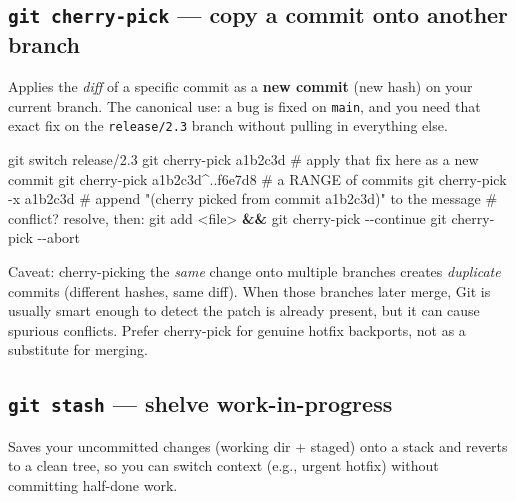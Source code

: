 \documentclass[11pt]{article}
\newenvironment{Shaded}{\begin{snugshade}}{\end{snugshade}}
\newcommand{\AttributeTok}[1]{\textcolor[rgb]{0.16,0.50,0.73}{#1}}
\newcommand{\CommentTok}[1]{\textcolor[rgb]{0.48,0.49,0.49}{#1}}
\newcommand{\FunctionTok}[1]{\textcolor[rgb]{0.56,0.27,0.68}{#1}}
\newcommand{\KeywordTok}[1]{\textcolor[rgb]{0.81,0.81,0.76}{\textbf{#1}}}
\newcommand{\NormalTok}[1]{\textcolor[rgb]{0.81,0.81,0.76}{#1}}
\newcommand{\OperatorTok}[1]{\textcolor[rgb]{0.81,0.81,0.76}{#1}}
\begin{document}
\subsection{\texorpdfstring{\texttt{git\ cherry-pick} --- copy a commit onto another branch}{git cherry-pick --- copy a commit onto another branch}}\label{git-cherry-pick--copy-a-commit-onto-another-branch}

Applies the \emph{diff} of a specific commit as a \textbf{new commit} (new hash) on your current branch. The canonical use: a bug is fixed on \texttt{main}, and you need that exact fix on the \texttt{release/2.3} branch without pulling in everything else.


\begin{Shaded}
\begin{Highlighting}[]
\FunctionTok{git}\NormalTok{ switch release/2.3}
\FunctionTok{git}\NormalTok{ cherry{-}pick a1b2c3d              }\CommentTok{\# apply that fix here as a new commit}
\FunctionTok{git}\NormalTok{ cherry{-}pick a1b2c3d\^{}..f6e7d8     }\CommentTok{\# a RANGE of commits}
\FunctionTok{git}\NormalTok{ cherry{-}pick }\AttributeTok{{-}x}\NormalTok{ a1b2c3d           }\CommentTok{\# append "(cherry picked from commit a1b2c3d)" to the message}
\CommentTok{\# conflict? resolve, then:}
\FunctionTok{git}\NormalTok{ add }\OperatorTok{\textless{}}\NormalTok{file}\OperatorTok{\textgreater{}} \KeywordTok{\&\&} \FunctionTok{git}\NormalTok{ cherry{-}pick }\AttributeTok{{-}{-}continue}
\FunctionTok{git}\NormalTok{ cherry{-}pick }\AttributeTok{{-}{-}abort}
\end{Highlighting}
\end{Shaded}

Caveat: cherry-picking the \emph{same} change onto multiple branches creates \emph{duplicate} commits (different hashes, same diff). When those branches later merge, Git is usually smart enough to detect the patch is already present, but it can cause spurious conflicts. Prefer cherry-pick for genuine hotfix backports, not as a substitute for merging.

\subsection{\texorpdfstring{\texttt{git\ stash} --- shelve work-in-progress}{git stash --- shelve work-in-progress}}\label{git-stash--shelve-work-in-progress}

Saves your uncommitted changes (working dir + staged) onto a stack and reverts to a clean tree, so you can switch context (e.g., urgent hotfix) without committing half-done work.
\end{document}

